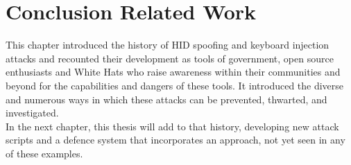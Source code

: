 \section{Conclusion Related Work}


This chapter introduced the history of HID spoofing and keyboard injection attacks and recounted their development as tools of government, open source enthusiasts and White Hats who raise awareness within their communities and beyond for the capabilities and dangers of these tools. It introduced the diverse and numerous ways in which these attacks can be prevented, thwarted, and investigated. \\
In the next chapter, this thesis will add to that history, developing new attack scripts and a defence system that incorporates an approach, not yet seen in any of these examples.


